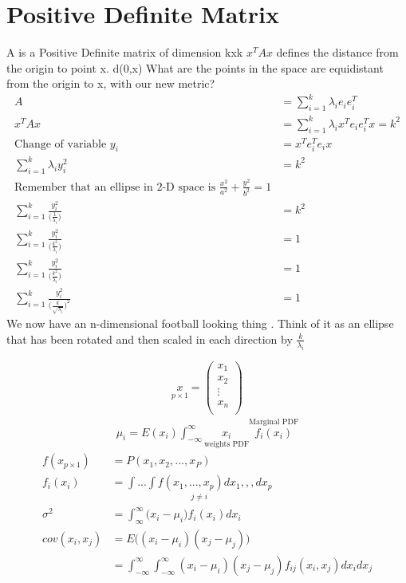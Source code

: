 \section{Positive Definite Matrix}
A is a Positive Definite matrix of dimension kxk
$x^TAx$ defines the distance from the origin to point x. d(0,x)
What are the points in the space are equidistant from the origin to x, with our new metric?
\begin{align*}
A &= \displaystyle\sum_{i = 1}^{k}\lambda_i e_ie_i^T \\
x^TAx &= \displaystyle\sum_{i = 1}^{k}\lambda_ix^T e_ie_i^Tx=k^2 \\
\text{Change of variable } y_i &= x^Te_i^Te_ix \\
\displaystyle\sum_{i=1}^{k}\lambda_i y_i^2 &= k^2 \\
\text{Remember that an ellipse in 2-D space is } \frac{x^2}{a^2} + \frac{y^2}{b^2} = 1 \\
\displaystyle\sum_{i=1}^{k}\frac{y_i^2}{\big(\frac{1}{\lambda_i }\big)} &= k^2 \\
\displaystyle\sum_{i=1}^{k}\frac{y_i^2}{\big(\frac{k^2}{\lambda_i }\big)} &= 1 \\
\displaystyle\sum_{i=1}^{k}\frac{y_i^2}{\big(\frac{k^2}{\lambda_i }\big)} &= 1 \\
\displaystyle\sum_{i=1}^{k}\frac{y_i^2}{\big(\frac{k}{\sqrt{\lambda_i} }\big)^2} &= 1
\end{align*}
We now have an n-dimensional football looking thing . Think of it as an ellipse that has been rotated and then scaled in each direction by $\frac{k}{\lambda_i}$

\begin{equation*}
\underset{p \times 1}{x} = 
    \begin{pmatrix}
    x_1\\
    x_2 \\
    \vdots\\
    x_n \\
    \end{pmatrix}
\end{equation*}
\begin{align*}
\mu_i = E(x_i) \int^{\infty}_{-\infty} \underset{\text{weights PDF}}{x_i} \overset{\text{Marginal PDF}}{f_i(x_i)}
\end{align*}
\begin{align*}
f(x_{p\times 1}) &= P(x_1, x_2, ... , x_P) \\
f_i(x_i) &=\underset{j\neq i}{\int ... \int f(x_1,...,x_p)dx_1,,,dx_p} \\
\sigma^2 &= \int_{\infty}^{\infty}\big(x_i - \mu_i \big)f_i(x_i)dx_i \\
cov(x_i,x_j) &= E\Bigg((x_i-\mu_i)(x_j-\mu_j) \Bigg) \\
&= \int^{\infty}_{-\infty}\int^{\infty}_{-\infty}(x_i-\mu_i)(x_j-\mu_j)f_{ij}(x_i,x_j)dx_idx_j
\end{align*}


